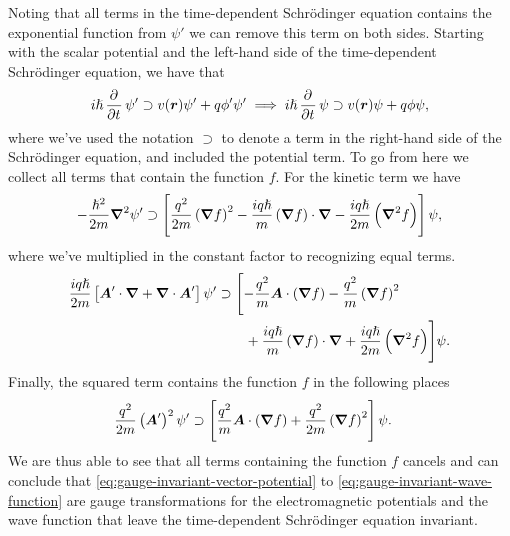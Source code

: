         Noting that all terms in the time-dependent Schrödinger equation
        contains the exponential function from $\psi'$ we can remove this term
        on both sides.
        Starting with the scalar potential and the left-hand side of the
        time-dependent Schrödinger equation, we have that
        \begin{align}
            i\hslash\dpd{}{t}\psi'
            \supset
            v(\vfg{r})\psi'
            +
            q\phi'\psi'
            \implies
            i\hslash\dpd{}{t}\psi
            \supset
            v(\vfg{r})\psi
            +
            q\phi\psi,
        \end{align}
        where we've used the notation $\supset$ to denote a term in the right-hand
        side of the Schrödinger equation, and included the potential term.
        To go from here we collect all terms that contain the function $f$.
        For the kinetic term we have
        \begin{align}
            -\frac{\hslash^2}{2m}\boldsymbol{\nabla}^2\psi'
            \supset
            \left[ 
                \frac{q^2}{2m}\left( \boldsymbol{\nabla}f \right)^2
                - \frac{iq\hslash}{m}\left( \boldsymbol{\nabla}f \right)\cdot\boldsymbol{\nabla}
                - \frac{iq\hslash}{2m}\left( \boldsymbol{\nabla}^2f \right)
             \right]\psi,
        \end{align}
        where we've multiplied in the constant factor to recognizing equal
        terms.
        \begin{align}
            \frac{iq\hslash}{2m}\left[ 
                \boldsymbol{A}'\cdot\boldsymbol{\nabla}
                + \boldsymbol{\nabla}\cdot\boldsymbol{A}'
             \right]\psi'
            &\supset
            \Biggl[
                - \frac{q^2}{m}\boldsymbol{A}\cdot\left( \boldsymbol{\nabla}f \right)
                - \frac{q^2}{m}\left( \boldsymbol{\nabla}f \right)^2
                \nonumber \\
                &\qquad
                + \frac{iq\hslash}{m}\left( \boldsymbol{\nabla}f \right)\cdot\boldsymbol{\nabla}
                + \frac{iq\hslash}{2m}\left( \boldsymbol{\nabla}^2f \right)
            \Biggr]\psi.
        \end{align}
        Finally, the squared term contains the function $f$ in the following
        places
        \begin{align}
            \frac{q^2}{2m}\left( \boldsymbol{A}' \right)^2\psi'
            &\supset
            \left[ 
                \frac{q^2}{m}\boldsymbol{A}\cdot\left( \boldsymbol{\nabla}f \right)
                + \frac{q^2}{2m}\left( \boldsymbol{\nabla}f \right)^2
             \right]\psi.
        \end{align}
        We are thus able to see that all terms containing the function $f$
        cancels and can conclude that
        \autoref{eq:gauge-invariant-vector-potential} to
        \autoref{eq:gauge-invariant-wave-function} are gauge transformations for
        the electromagnetic potentials and the wave function that leave the
        time-dependent Schrödinger equation invariant.

